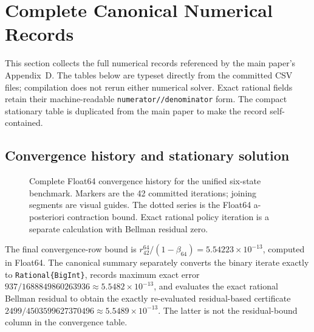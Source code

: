 \section{Complete Canonical Numerical Records}
\label{sec:supp-canonical-records}

This section collects the full numerical records referenced by the main
paper's Appendix~D.  The tables below are typeset directly from the committed
CSV files; compilation does not rerun either numerical solver.  Exact rational
fields retain their machine-readable \texttt{numerator//denominator} form.
The compact stationary table is duplicated from the main paper to make the
record self-contained.

\newcommand{\recordfield}[1]{{\ttfamily\expandafter\detokenize\expandafter{#1}}}

\clearpage
\subsection{Convergence history and stationary solution}

\begin{figure}[htbp]
  \centering
  
  \caption{Complete Float64 convergence history for the unified six-state
  benchmark.  Markers are the 42 committed iterations; joining segments are
  visual guides.  The dotted series is the Float64 a-posteriori contraction
  bound.  Exact rational policy iteration is a separate calculation with
  Bellman residual zero.}
  \label{fig:supp-canonical-convergence}
\end{figure}

The final convergence-row bound is
\(r_{42}^{64}/(1-\beta_{64})=5.54223\times10^{-13}\), computed in Float64.
The canonical summary separately converts the binary iterate exactly to
\texttt{Rational\{BigInt\}}, records maximum exact error
\(937/1688849860263936\approx5.5482\times10^{-13}\), and evaluates the exact
rational Bellman residual to obtain the exactly re-evaluated residual-based
certificate
\(2499/4503599627370496\approx5.5489\times10^{-13}\).  The latter is not the
residual-bound column in the convergence table.

